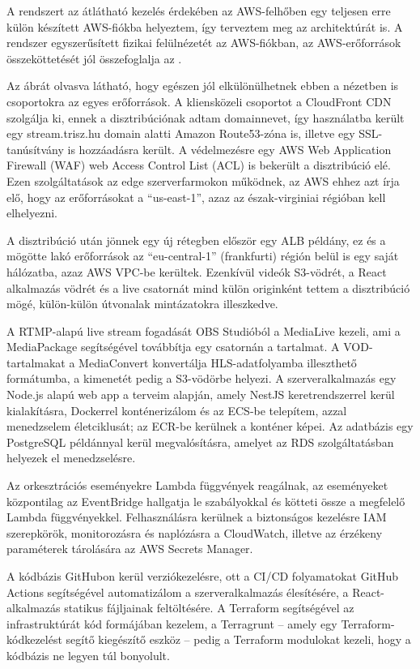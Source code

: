 A rendszert az átlátható kezelés érdekében az AWS-felhőben egy teljesen erre külön készített AWS-fiókba helyeztem, így terveztem meg az architektúrát is. A rendszer egyszerűsített fizikai felülnézetét az AWS-fiókban, az AWS-erőforrások összeköttetését jól összefoglalja az .

Az ábrát olvasva látható, hogy egészen jól elkülönülhetnek ebben a nézetben is csoportokra az egyes erőforrások. A kliensközeli csoportot a CloudFront CDN szolgálja ki, ennek a disztribúciónak adtam domainnevet, így használatba került egy stream.trisz.hu domain alatti Amazon Route53-zóna is, illetve egy SSL-tanúsítvány is hozzáadásra került. A védelmezésre egy AWS Web Application Firewall (WAF) web Access Control List (ACL) is bekerült a disztribúció elé. Ezen szolgáltatások az edge szerverfarmokon működnek, az AWS ehhez azt írja elő, hogy az erőforrásokat a ``us-east-1'', azaz az észak-virginiai régióban kell elhelyezni.

A disztribúció után jönnek egy új rétegben először egy ALB példány, ez és a mögötte lakó erőforrások az ``eu-central-1'' (frankfurti) régión belül is egy saját hálózatba, azaz AWS VPC-be kerültek. Ezenkívül videók S3-vödrét, a React alkalmazás vödrét és a live csatornát mind külön originként tettem a disztribúció mögé, külön-külön útvonalak mintázatokra illeszkedve.

A RTMP-alapú live stream fogadását OBS Studióból a MediaLive kezeli, ami a MediaPackage segítségével továbbítja egy csatornán a tartalmat. A VOD-tartalmakat a MediaConvert konvertálja HLS-adatfolyamba illeszthető formátumba, a kimenetét pedig a S3-vödörbe helyezi. A szerveralkalmazás egy Node.js alapú web app a terveim alapján, amely NestJS keretrendszerrel kerül kialakításra, Dockerrel konténerizálom és az ECS-be telepítem, azzal menedzselem életciklusát; az ECR-be kerülnek a konténer képei. Az adatbázis egy PostgreSQL példánnyal kerül megvalósításra, amelyet az RDS szolgáltatásban helyezek el menedzselésre.

Az orkesztrációs eseményekre Lambda függvények reagálnak, az eseményeket központilag az EventBridge hallgatja le szabályokkal és kötteti össze a megfelelő Lambda függvényekkel. Felhasználásra kerülnek a biztonságos kezelésre IAM szerepkörök, monitorozásra és naplózásra a CloudWatch, illetve az érzékeny paraméterek tárolására az AWS Secrets Manager.

A kódbázis GitHubon kerül verziókezelésre, ott a CI/CD folyamatokat GitHub Actions segítségével automatizálom a szerveralkalmazás élesítésére, a React-alkalmazás statikus fájljainak feltöltésére. A Terraform segítségével az infrastruktúrát kód formájában kezelem, a Terragrunt -- amely egy Terraform-kódkezelést segítő kiegészítő eszköz -- pedig a Terraform modulokat kezeli, hogy a kódbázis ne legyen túl bonyolult.

